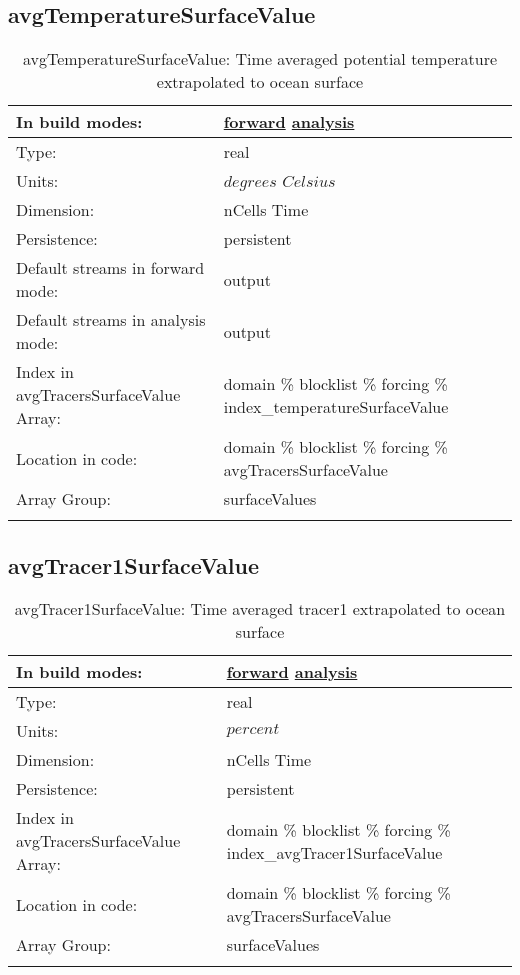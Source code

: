 \subsection[avgTemperatureSurfaceValue]{avgTemperatureSurfaceValue}
\label{subsec:var_sec_forcing_avgTemperatureSurfaceValue}
\begin{center}
\begin{longtable}{| p{2.0in} | p{4.0in} |}
        \hline 
        In build modes: & \hyperref[subsec:forward_var_tab_forcing]{forward} \hyperref[subsec:analysis_var_tab_forcing]{analysis} \\
        \hline 
        Type: & real \\
        \hline 
        Units: & $degrees$ $Celsius$ \\
        \hline 
        Dimension: & nCells Time \\
        \hline 
        Persistence: & persistent \\
        \hline 
		 Default streams in forward mode: &  output \\
        \hline 
		 Default streams in analysis mode: &  output \\
        \hline 
		 Index in avgTracersSurfaceValue Array: & domain \% blocklist \% forcing \% index\_temperatureSurfaceValue \\
		 \hline 
		 Location in code: & domain \% blocklist \% forcing \% avgTracersSurfaceValue \\
		 \hline 
		 Array Group: & surfaceValues \\
		 \hline 
    \caption{avgTemperatureSurfaceValue: Time averaged potential temperature extrapolated to ocean surface}
\end{longtable}
\end{center}
\subsection[avgTracer1SurfaceValue]{avgTracer1SurfaceValue}
\label{subsec:var_sec_forcing_avgTracer1SurfaceValue}
\begin{center}
\begin{longtable}{| p{2.0in} | p{4.0in} |}
        \hline 
        In build modes: & \hyperref[subsec:forward_var_tab_forcing]{forward} \hyperref[subsec:analysis_var_tab_forcing]{analysis} \\
        \hline 
        Type: & real \\
        \hline 
        Units: & $percent$ \\
        \hline 
        Dimension: & nCells Time \\
        \hline 
        Persistence: & persistent \\
        \hline 
		 Index in avgTracersSurfaceValue Array: & domain \% blocklist \% forcing \% index\_avgTracer1SurfaceValue \\
		 \hline 
		 Location in code: & domain \% blocklist \% forcing \% avgTracersSurfaceValue \\
		 \hline 
		 Array Group: & surfaceValues \\
		 \hline 
    \caption{avgTracer1SurfaceValue: Time averaged tracer1 extrapolated to ocean surface}
\end{longtable}
\end{center}
